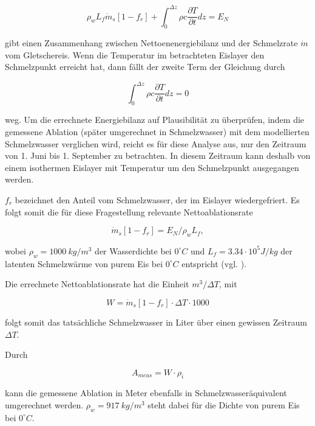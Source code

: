 \documentclass[12pt,a4paper]{article}
\begin{document}
\begin{equation}
\rho_{w} L_{f} \dot{m}_{s}\left[1-f_{r}\right]+\int_{0}^{\Delta z} \rho c \frac{\partial T}{\partial t} d z=E_{N}
\end{equation}


gibt einen Zusammenhang zwischen Nettoenenergiebilanz und der Schmelzrate $\dot{m}$ vom Gletschereis. Wenn die Temperatur im betrachteten Eislayer den Schmelzpunkt erreicht hat, dann fällt der zweite Term der Gleichung durch


\begin{equation}
\int_{0}^{\Delta z} \rho c \frac{\partial T}{\partial t} d z=0
\end{equation}

weg. Um die errechnete Energiebilanz auf Plausibilität zu überprüfen, indem die gemessene Ablation (später umgerechnet in Schmelzwasser) mit dem modellierten Schmelzwasser verglichen wird, reicht es für diese Analyse aus, nur den Zeitraum von 1. Juni bis 1. September zu betrachten. In diesem Zeitraum kann deshalb von einem isothermen Eislayer mit Temperatur um den Schmelzpunkt ausgegangen werden.

$f_r$ bezeichnet den Anteil vom Schmelzwasser, der im Eislayer wiedergefriert. Es folgt somit die für diese Fragestellung relevante Nettoablationsrate 

\begin{equation}
\dot{m}_{s}\left[1-f_{r}\right]=E_{N} / \rho_{w} L_{f},
\end{equation}

wobei $\rho_{w}=1000~kg/m^{3}$ der Wasserdichte bei $0^\circ C$ und $L_{f}=3.34 \cdot 10^5 J/kg$ der latenten Schmelzwärme von purem Eis bei $0^\circ C$ entspricht (vgl. \cite[142]{ThePhysicsOfGlaciers}).

Die errechnete Nettoablationsrate hat die Einheit $m^3/\Delta T$, mit

\begin{equation}
W = \dot{m}_{s}\left[1-f_{r}\right] \cdot \Delta T \cdot 1000
\end{equation}


folgt somit das tatsächliche Schmelzwasser in Liter über einen gewissen Zeitraum $\Delta T$.

Durch 

\begin{equation}
A_{meas} = W \cdot \rho_{i}
\end{equation}


kann die gemessene Ablation in Meter ebenfalls in Schmelzwasseräquivalent umgerechnet werden. $\rho_{w}=917~kg/m^3$ steht dabei für die Dichte von purem Eis bei $0^\circ C$.\\
\end{document}
